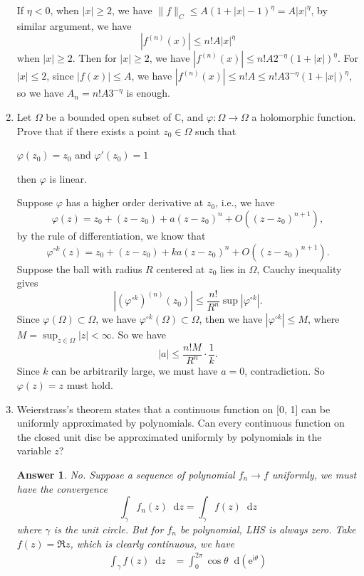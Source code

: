 \documentclass[11pt]{report}
\theoremstyle{mythm}
\let\oldendproof\endproof
\renewenvironment{proof}[1][\proofname]{%
  \oldproof[\normalfont \bfseries #1]%
}{\oldendproof}
\renewcommand*{\proofname}{Proof}
\theoremstyle{myans}
\newtheorem*{answer}{Answer}
\newcommand{\mi}{\mathrm{i}}
\newcommand{\me}{\mathrm{e}}
\newcommand{\dd}{\mathop{}\!\mathrm{d}}
\newcommand{\bbC}{\mathbb{C}}
\newcommand{\norm}[1]{\|#1\|}
\begin{document}
\begin{enumerate}
\begin{proof}
    If $\eta < 0$, when $|x|\geq 2$, we have $\norm{f}_C \leq A(1 + |x| - 1)^\eta = A|x|^\eta$,
    by similar argument, we have
    \[ |f^{(n)} (x)| \leq n! A |x|^\eta \]
    when $|x|\geq 2$. Then for $|x|\geq 2$, we have $|f^{(n)}(x)|\leq n! A 2^{-\eta} (1+|x|)^\eta$.
    For $|x|\leq 2$, since $|f(x)|\leq A$, we have $|f^{(n)}(x)|\leq n! A \leq n! A3^{-\eta}(1+|x|)^\eta$, 
    so we have $A_n = n! A 3^{-\eta}$ is enough.
  \end{proof}
  \item Let $\Omega$ be a bounded open subset of $\bbC$, and $\varphi\colon \Omega\to \Omega$ a holomorphic function.
  Prove that if there exists a point $z_0\in \Omega$ such that
  \begin{center}
    $\varphi(z_0)=z_0$ and $\varphi'(z_0)=1$
  \end{center}
  then $\varphi$ is linear.
  \begin{proof}
    Suppose $\varphi$ has a higher order derivative at $z_0$, i.e., we have
    \[ \varphi(z) = z_0+(z-z_0) + a (z-z_0)^n + O((z-z_0)^{n+1}), \]
    by the rule of differentiation, we know that
    \[ \varphi^{\circ k}(z) = z_0+(z-z_0) + ka (z-z_0)^n + O((z-z_0)^{n+1}). \]
    Suppose the ball with radius $R$ centered at $z_0$ lies in $\Omega$, Cauchy inequality gives
    \[ \left|(\varphi^{\circ k})^{(n)}(z_0)\right| \leq \frac{n! }{R^n} \sup |\varphi^{\circ k}|. \]
    Since $\varphi(\Omega)\subset \Omega$, we have $\varphi^{\circ k}(\Omega)\subset \Omega$, then
    we have $|\varphi^{\circ k}| \leq M$, where $M = \sup_{z\in \Omega} |z| < \infty$.
    So we have
    \[ |a| \leq \frac{n!M}{R^n} \cdot \frac 1 k. \]
    Since $k$ can be arbitrarily large, we must have $a=0$, contradiction. So 
    $\varphi(z)=z$ must hold.
  \end{proof}
  \item Weierstrass's theorem states that a continuous function on [0, 1] can be uniformly
  approximated by polynomials. Can every continuous function on the closed unit disc be approximated uniformly
  by polynomials in the variable $z$?
  \begin{answer}
    No. Suppose a sequence of polynomial $f_n \to f$ uniformly, we must have the convergence
    \[ \int_\gamma f_n(z)\dd z = \int_\gamma f(z)\dd z \]
    where $\gamma$ is the unit circle. But for $f_n$ be polynomial, LHS is always zero. Take
    $f(z)=\Re z$, which is clearly continuous, we have
    \begin{align*}
      \int_\gamma f(z)\dd z &= \int_0^{2\pi} \cos \theta \dd(\me^{\mi \theta})\\

\end{align*}
\end{answer}
\end{enumerate}
\end{document}
